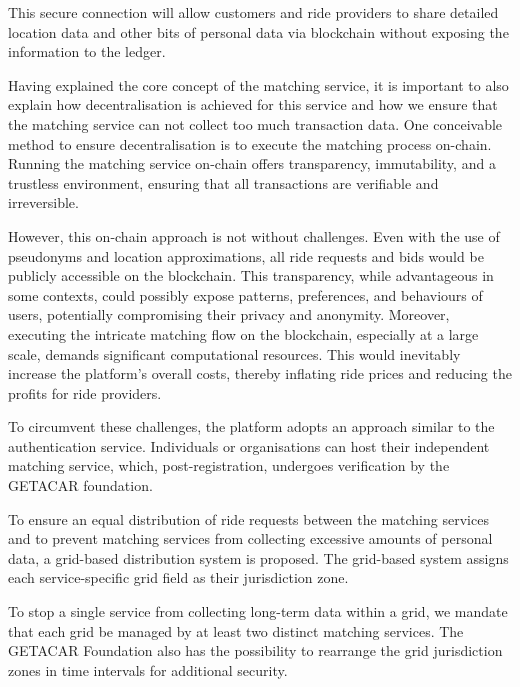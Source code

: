 This secure connection will allow customers and ride providers to share detailed location data and other bits of personal data via blockchain without exposing the information to the ledger.

Having explained the core concept of the matching service, it is important to also explain how decentralisation is achieved for this service and how we ensure that the matching service can not collect too much transaction data. One conceivable method to ensure decentralisation is to execute the matching process on-chain. Running the matching service on-chain offers transparency, immutability, and a trustless environment, ensuring that all transactions are verifiable and irreversible.

However, this on-chain approach is not without challenges. Even with the use of pseudonyms and location approximations, all ride requests and bids would be publicly accessible on the blockchain. This transparency, while advantageous in some contexts, could possibly expose patterns, preferences, and behaviours of users, potentially compromising their privacy and anonymity. Moreover, executing the intricate matching flow on the blockchain, especially at a large scale, demands significant computational resources. This would inevitably increase the platform's overall costs, thereby inflating ride prices and reducing the profits for ride providers.

To circumvent these challenges, the platform adopts an approach similar to the authentication service. Individuals or organisations can host their independent matching service, which, post-registration, undergoes verification by the GETACAR foundation. 

To ensure an equal distribution of ride requests between the matching services and to prevent matching services from collecting excessive amounts of personal data, a grid-based distribution system is proposed. The grid-based system assigns each service-specific grid field as their jurisdiction zone.

To stop a single service from collecting long-term data within a grid, we mandate that each grid be managed by at least two distinct matching services. The GETACAR Foundation also has the possibility to rearrange the grid jurisdiction zones in time intervals for additional security.

